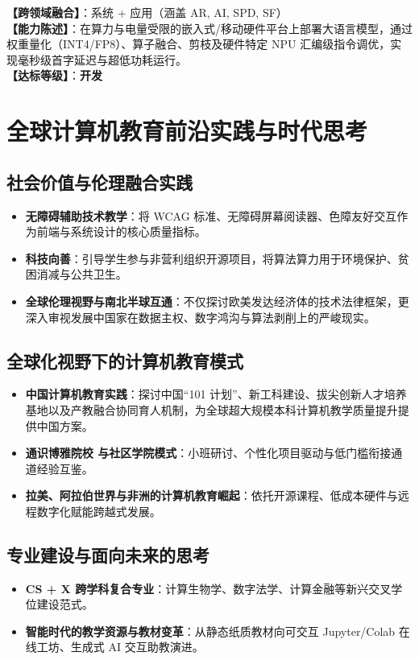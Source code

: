 \begin{taskbox}
\textbf{【跨领域融合】}：系统 + 应用（涵盖 AR, AI, SPD, SF）\\
\textbf{【能力陈述】}：在算力与电量受限的嵌入式/移动硬件平台上部署大语言模型，通过权重量化（INT4/FP8）、算子融合、剪枝及硬件特定 NPU 汇编级指令调优，实现毫秒级首字延迟与超低功耗运行。\\
\textbf{【达标等级】}：\textbf{开发}
\end{taskbox}

\section{全球计算机教育前沿实践与时代思考}

\subsection{社会价值与伦理融合实践}
\begin{itemize}
    \item \textbf{无障碍辅助技术教学}：将 WCAG 标准、无障碍屏幕阅读器、色障友好交互作为前端与系统设计的核心质量指标。
    \item \textbf{科技向善}：引导学生参与非营利组织开源项目，将算法算力用于环境保护、贫困消减与公共卫生。
    \item \textbf{全球伦理视野与南北半球互通}：不仅探讨欧美发达经济体的技术法律框架，更深入审视发展中国家在数据主权、数字鸿沟与算法剥削上的严峻现实。
\end{itemize}

\subsection{全球化视野下的计算机教育模式}
\begin{itemize}
    \item \textbf{中国计算机教育实践}：探讨中国“101 计划”、新工科建设、拔尖创新人才培养基地以及产教融合协同育人机制，为全球超大规模本科计算机教学质量提升提供中国方案。
    \item \textbf{通识博雅院校 与社区学院模式}：小班研讨、个性化项目驱动与低门槛衔接通道经验互鉴。
    \item \textbf{拉美、阿拉伯世界与非洲的计算机教育崛起}：依托开源课程、低成本硬件与远程数字化赋能跨越式发展。
\end{itemize}

\subsection{专业建设与面向未来的思考}
\begin{itemize}
    \item \textbf{CS + X 跨学科复合专业}：计算生物学、数字法学、计算金融等新兴交叉学位建设范式。
    \item \textbf{智能时代的教学资源与教材变革}：从静态纸质教材向可交互 Jupyter/Colab 在线工坊、生成式 AI 交互助教演进。
\end{itemize}
